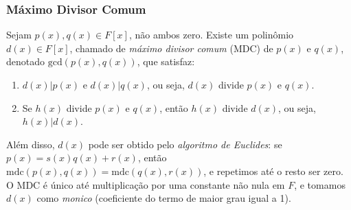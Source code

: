 \subsubsection*{Máximo Divisor Comum}

\begin{theorem}
  Sejam $p(x), q(x) \in F[x]$, não ambos zero. Existe um polinômio $d(x) \in F[x]$,
  chamado de \emph{máximo divisor comum} (MDC) de $p(x)$ e $q(x)$,
  denotado $\text{gcd}(p(x), q(x))$, que satisfaz:
  \begin{enumerate}
    \item[(i)] $d(x)|p(x)$ e $d(x)|q(x)$, ou seja, $d(x)$ divide $p(x)$ e $q(x)$.
    \item[(ii)] Se $h(x)$ divide $p(x)$ e $q(x)$, então $h(x)$ divide $d(x)$, ou seja, $h(x)|d(x)$.
  \end{enumerate}
  Além disso, $d(x)$ pode ser obtido pelo \emph{algoritmo de Euclides}: se
  $p(x) = s(x) q(x) + r(x)$, então
  $\text{mdc}(p(x), q(x)) = \text{mdc}(q(x), r(x))$, e repetimos até o resto ser zero.
  O MDC é único até multiplicação por
  uma constante não nula em $F$, e tomamos $d(x)$ como \emph{monico}
  (coeficiente do termo de maior grau igual a 1).
\end{theorem}

